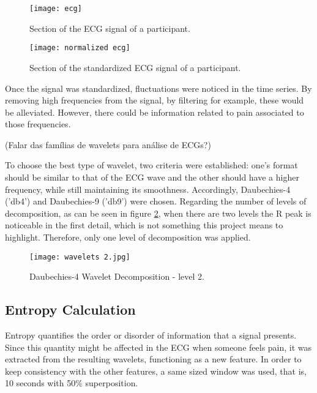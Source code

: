 \begin{figure}[htbp]
    \centering
    \begin{minipage}{0.45\textwidth}
        \centering
        \texttt{[image: ecg]}
        \caption{Section of the ECG signal of a participant.}
        \label{fig:ecg}
    \end{minipage}
    \hfill
    \begin{minipage}{0.45\textwidth}
        \centering
        \texttt{[image: normalized ecg]}
        \caption{Section of the standardized ECG signal of a participant.}
        \label{fig:normalized_ecg}
    \end{minipage}
\end{figure}

Once the signal was standardized, fluctuations were noticed in the time series.
By removing high frequencies from the signal, by filtering for example, these would be alleviated.
However, there could be information related to pain associated to those frequencies.

(Falar das famílias de wavelets para análise de ECGs?)

To choose the best type of wavelet, two criteria were established: one's format should be similar to that of the ECG wave and the other should have a higher frequency, while still maintaining its smoothness.
Accordingly, Daubechies-4 ('db4') and Daubechies-9 ('db9') were chosen.
Regarding the number of levels of decomposition, as can be seen in figure \ref{fig:wavelets2}, when there are two levels the R peak is noticeable in the first detail, which is not something this project means to highlight.
Therefore, only one level of decomposition was applied.

\begin{figure}[h!]
    \centering
    \texttt{[image: wavelets 2.jpg]}
    \caption{Daubechies-4 Wavelet Decomposition - level 2.}
    \label{fig:wavelets2}
\end{figure}


\subsection{Entropy Calculation}
Entropy quantifies the order or disorder of information that a signal presents. Since this quantity might be affected in the ECG when someone feels pain, it was extracted from the resulting wavelets, functioning as a new feature. In order to keep consistency with the other features, a same sized window was used, that is, 10 seconds with 50\% superposition. 

